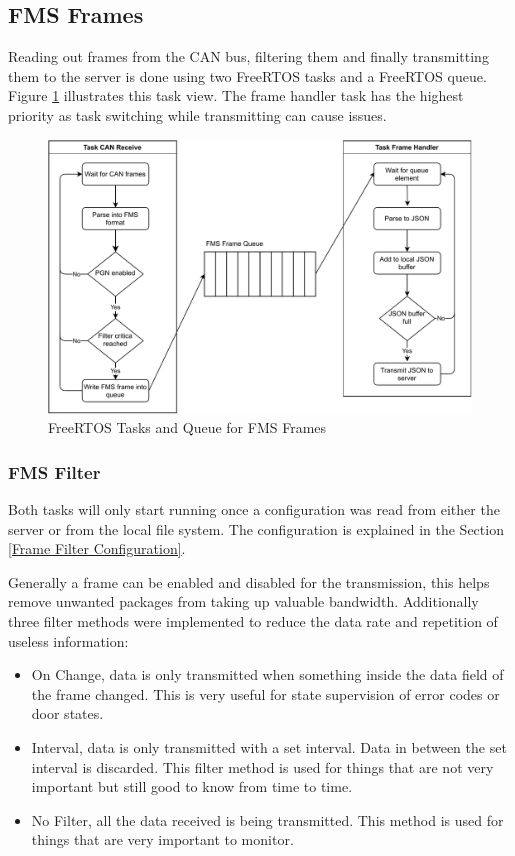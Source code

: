 \newpage
\subsection{FMS Frames} \label{FMS Frame Handler}
Reading out frames from the CAN bus, filtering them and finally transmitting them to the server is done using two FreeRTOS tasks and a FreeRTOS queue. Figure \ref{fig:fms-software} illustrates this task view. The frame handler task has the highest priority as task switching while transmitting can cause issues.
\begin{figure}[h!]
	\centering
	\includegraphics[width=\textwidth]{images/fms-software}
	\caption{FreeRTOS Tasks and Queue for FMS Frames}
	\label{fig:fms-software}
\end{figure}

\subsubsection{FMS Filter}
Both tasks will only start running once a configuration was read from either the server or from the local file system. The configuration is explained in the Section \ref{Frame Filter Configuration}.

Generally a frame can be enabled and disabled for the transmission, this helps remove unwanted packages from taking up valuable bandwidth. Additionally three filter methods were implemented to reduce the data rate and repetition of useless information:
\begin{itemize}
		\item On Change, data is only transmitted when something inside the data field of the frame changed. This is very useful for state supervision of error codes or door states. 
		\item Interval, data is only transmitted with a set interval. Data in between the set interval is discarded. This filter method is used for things that are not very important but still good to know from time to time.
		\item No Filter, all the data received is being transmitted. This method is used for things that are very important to monitor.
\end{itemize}

